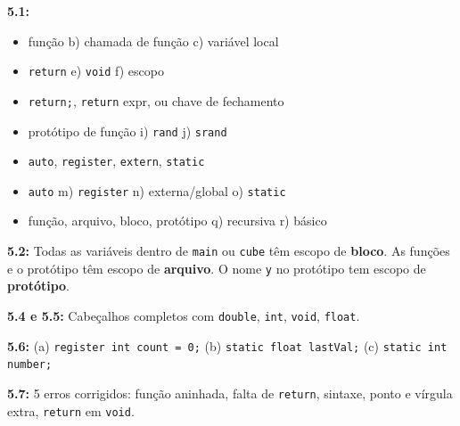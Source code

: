 \documentclass[12pt,a4paper]{article}
\begin{document}
\begin{tcolorbox}[colback=deitellightblue,colframe=deitelblue,title={\bfseries\large Respostas Resumidas}]

\textbf{5.1:}
\begin{itemize}[noitemsep]
  \item[a)] função \quad b) chamada de função \quad c) variável local
  \item[d)] \texttt{return} \quad e) \texttt{void} \quad f) escopo
  \item[g)] \texttt{return;}, \texttt{return} expr, ou chave de fechamento
  \item[h)] protótipo de função \quad i) \texttt{rand} \quad j) \texttt{srand}
  \item[k)] \texttt{auto}, \texttt{register}, \texttt{extern}, \texttt{static}
  \item[l)] \texttt{auto} \quad m) \texttt{register} \quad n) externa/global \quad o) \texttt{static}
  \item[p)] função, arquivo, bloco, protótipo \quad q) recursiva \quad r) básico
\end{itemize}

\medskip\textbf{5.2:} Todas as variáveis dentro de \texttt{main} ou \texttt{cube}
têm escopo de \textbf{bloco}. As funções e o protótipo têm escopo de \textbf{arquivo}.
O nome \texttt{y} no protótipo tem escopo de \textbf{protótipo}.

\medskip\textbf{5.4 e 5.5:} Cabeçalhos completos com \texttt{double}, \texttt{int},
\texttt{void}, \texttt{float}.

\medskip\textbf{5.6:} (a) \texttt{register int count = 0;}
(b) \texttt{static float lastVal;}
(c) \texttt{static int number;}

\medskip\textbf{5.7:} 5 erros corrigidos: função aninhada, falta de \texttt{return},
sintaxe, ponto e vírgula extra, \texttt{return} em \texttt{void}.

\end{tcolorbox}
\end{document}
